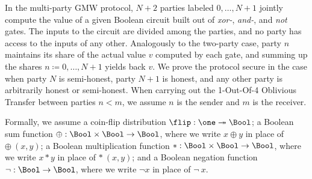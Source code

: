 \renewcommand{\LeakShare}{\mathsf{Share}}
\renewcommand{\LeakOutShare}{\mathsf{OutShare}}
\newcommand{\LeakSumOutShare}{\mathsf{OutShare}\textsf{-}\Sigma}
\renewcommand{\LeakOTMsg}{\mathsf{OTMsg}}
\renewcommand{\LeakOTMsgRcvd}{\mathsf{OTMsgRcvd}}
\renewcommand{\LeakOTChc}{\mathsf{OTChc}}
\renewcommand{\LeakOTChcRcvd}{\mathsf{OTChcRcvd}}
\renewcommand{\InitOk}{\mathsf{Init}\textsf{-}\checkmark}
\renewcommand{\WiresOk}{\mathsf{Wires}\textsf{-}\checkmark}
\renewcommand{\SharesOk}{\mathsf{Shares}\textsf{-}\checkmark}
\newcommand{\CtrbsOk}{\mathsf{Ctrbs}\textsf{-}\checkmark}
\renewcommand{\InOk}{\mathsf{In}\textsf{-}\checkmark}
\renewcommand{\WireOk}{\mathsf{Wire}\textsf{-}\checkmark}
\renewcommand{\InShareGenOk}{\mathsf{InShare}\textsf{-}\$\textsf{-}\checkmark}
\newcommand{\SumInShareGenOk}{\mathsf{InShare}\textsf{-}\$\textsf{-}\Sigma\textsf{-}\checkmark}
\renewcommand{\InShareOk}{\mathsf{InShare}\textsf{-}\checkmark}
\renewcommand{\SendBitOk}{\mathsf{SendBit}\textsf{-}\checkmark}
\renewcommand{\RcvdBitOk}{\mathsf{RcvdBit}\textsf{-}\checkmark}
\newcommand{\CtrbOk}{\mathsf{Ctrb}\textsf{-}\checkmark}
\newcommand{\SumCtrbOk}{\mathsf{Ctrb}\textsf{-}\Sigma\textsf{-}\checkmark}
\renewcommand{\ShareOk}{\mathsf{Share}\textsf{-}\checkmark}
\newcommand{\SumShareOk}{\mathsf{Share}\textsf{-}\Sigma\textsf{-}\checkmark}

In the multi-party GMW protocol, $N+2$ parties labeled $0,\ldots,N+1$ jointly compute the value of a given Boolean circuit built out of \emph{xor-}, \emph{and-}, and \emph{not} gates. The inputs to the circuit are divided among the parties, and no party has access to the inputs of any other. Analogously to the two-party case, party $n$ maintains its share of the actual value $v$ computed by each gate, and summing up the shares $n \coloneqq 0, \ldots, N+1$ yields back $v$. We prove the protocol secure in the case when party $N$ is semi-honest, party $N+1$ is honest, and any other party is arbitrarily honest or semi-honest. When carrying out the 1-Out-Of-4 Oblivious Transfer between parties $n < m$, we assume $n$ is the sender and $m$ is the receiver.

Formally, we assume a coin-flip distribution $\flip : \one \twoheadrightarrow \Bool$; a Boolean sum function $\oplus : \Bool \times \Bool \rightarrow \Bool$, where we write $x \oplus y$ in place of $\oplus \ (x,y)$; a Boolean multiplication function $* : \Bool \times \Bool \rightarrow \Bool$, where we write $x * y$ in place of $* \ (x,y)$; and a Boolean negation function $\neg : \Bool \rightarrow \Bool$, where we write $\neg x$ in place of $\neg \ x$.

